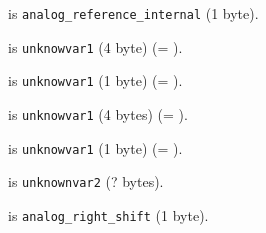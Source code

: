  is \texttt{analog\_reference\_internal} (1 byte).

 is \texttt{unknowvar1} (4 byte) (= ).

 is \texttt{unknowvar1} (1 byte) (= ).

 is \texttt{unknowvar1} (4 bytes) (= ).

 is \texttt{unknowvar1} (1 byte) (= ).

 is \texttt{unknownvar2} (? bytes).

 is \texttt{analog\_right\_shift} (1 byte).
